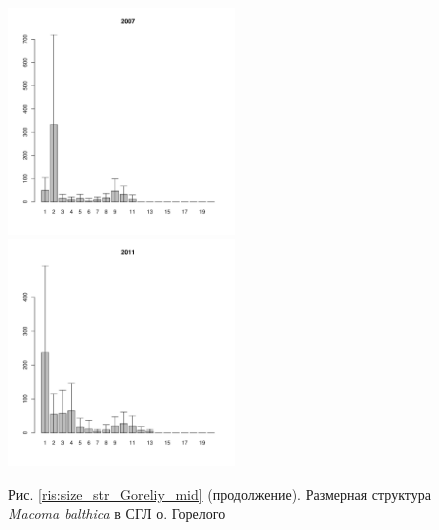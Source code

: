 \documentclass[12pt, a4paper]{article}
\begin{document}
\begin{figure}[h]

\begin{multicols}{3}
\hfill
\includegraphics[width=60mm]{../White_Sea/Luvenga_Goreliy/middle_2007_.pdf}
\hfill
\includegraphics[width=60mm]{../White_Sea/Luvenga_Goreliy/middle_2011_.pdf}
\end{multicols}


\begin{center}
Рис. \ref{ris:size_str_Goreliy_mid} (продолжение). Размерная структура {\it Macoma balthica} в СГЛ о. Горелого

\end{center}
\end{figure}

\end{document}
